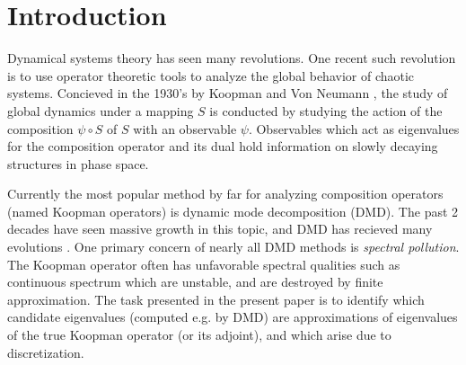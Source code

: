 
\section{Introduction}

Dynamical systems theory has seen many revolutions. One recent such revolution is to use 
operator theoretic tools to analyze the global behavior of chaotic systems. Concieved in 
the 1930's by Koopman and Von Neumann \cite{KoopmanOG}, the study of global dynamics 
under a mapping $S$ is conducted by studying the action of the composition $\psi \circ S$ 
of $S$ with an observable $\psi$. Observables which act as eigenvalues for the composition 
operator and its dual hold information on slowly decaying structures in phase space. 

Currently the most popular method by far for analyzing composition operators (named Koopman 
operators) is dynamic mode decomposition (DMD). The past 2 decades have seen massive growth 
in this topic, and DMD has recieved many evolutions \cite{DMDmultiverse}. One primary 
concern of nearly all DMD methods is \emph{spectral pollution}. The Koopman operator often 
has unfavorable spectral qualities such as continuous spectrum which are unstable, and are 
destroyed by finite approximation. The task presented in the present paper is to identify 
which candidate eigenvalues (computed e.g. by DMD) are approximations of eigenvalues of 
the true Koopman operator (or its adjoint), and which arise due to discretization. 

